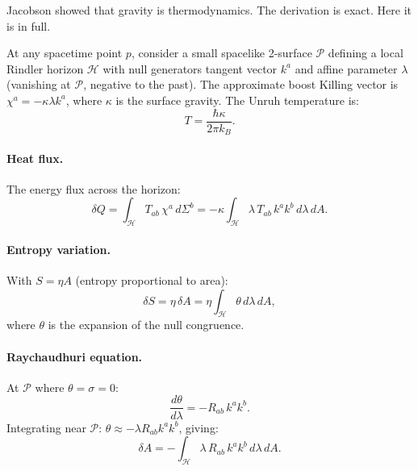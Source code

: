 \documentclass[12pt,a4paper]{article}
\begin{document}
Jacobson showed that gravity is thermodynamics. The derivation is exact.
Here it is in full.

At any spacetime point $p$, consider a small spacelike 2-surface $\mathcal{P}$
defining a local Rindler horizon $\mathcal{H}$ with null generators tangent
vector $k^a$ and affine parameter $\lambda$ (vanishing at $\mathcal{P}$,
negative to the past). The approximate boost Killing vector is
$\chi^a = -\kappa\lambda k^a$, where $\kappa$ is the surface gravity.
The Unruh temperature is:
\begin{equation}
T = \frac{\hbar\kappa}{2\pi k_B}.
\label{eq:unruh}
\end{equation}

\paragraph{Heat flux.} The energy flux across the horizon:
\begin{equation}
\delta Q = \int_{\mathcal{H}} T_{ab}\,\chi^a\,d\Sigma^b
= -\kappa \int_{\mathcal{H}} \lambda\,T_{ab}\,k^a k^b\,d\lambda\,dA.
\label{eq:heat_flux}
\end{equation}

\paragraph{Entropy variation.} With $S = \eta A$ (entropy proportional to area):
\begin{equation}
\delta S = \eta\,\delta A = \eta \int_{\mathcal{H}} \theta\,d\lambda\,dA,
\label{eq:dS_jac}
\end{equation}
where $\theta$ is the expansion of the null congruence.

\paragraph{Raychaudhuri equation.} At $\mathcal{P}$ where $\theta = \sigma = 0$:
\begin{equation}
\frac{d\theta}{d\lambda} = -R_{ab}\,k^a k^b.
\label{eq:raychaudhuri}
\end{equation}
Integrating near $\mathcal{P}$: $\theta \approx -\lambda R_{ab}k^a k^b$, giving:
\begin{equation}
\delta A = -\int_{\mathcal{H}} \lambda\,R_{ab}\,k^a k^b\,d\lambda\,dA.
\label{eq:dA_jac}
\end{equation}
\end{document}
